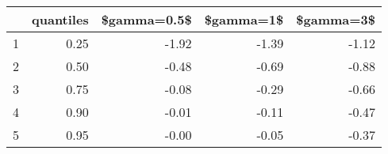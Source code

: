 \begin{table}[ht]
\centering
\begin{tabular}{rrrrr}
  \hline
 & quantiles & \$gamma=0.5\$ & \$gamma=1\$ & \$gamma=3\$ \\ 
  \hline
1 & 0.25 & -1.92 & -1.39 & -1.12 \\ 
  2 & 0.50 & -0.48 & -0.69 & -0.88 \\ 
  3 & 0.75 & -0.08 & -0.29 & -0.66 \\ 
  4 & 0.90 & -0.01 & -0.11 & -0.47 \\ 
  5 & 0.95 & -0.00 & -0.05 & -0.37 \\ 
   \hline
\end{tabular}
\end{table}
